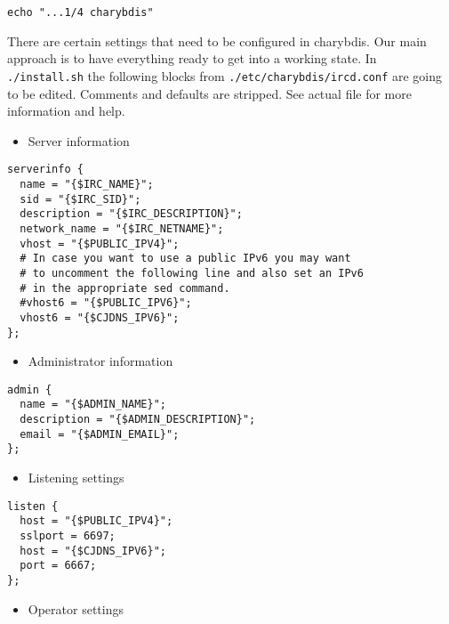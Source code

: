 \documentclass[12pt]{report}
\begin{document}
\begin{verbatim}
echo "...1/4 charybdis"
\end{verbatim}

There are certain settings that need to be configured in charybdis. Our
main approach is to have everything ready to get into a working state.
In \texttt{./install.sh} the following blocks from
\texttt{./etc/charybdis/ircd.conf} are going to be edited. Comments and
defaults are stripped. See actual file for more information and help.

\begin{itemize}

\item
  Server information
\end{itemize}

\begin{verbatim}
serverinfo {
  name = "{$IRC_NAME}";
  sid = "{$IRC_SID}";
  description = "{$IRC_DESCRIPTION}";
  network_name = "{$IRC_NETNAME}";
  vhost = "{$PUBLIC_IPV4}";
  # In case you want to use a public IPv6 you may want
  # to uncomment the following line and also set an IPv6
  # in the appropriate sed command.
  #vhost6 = "{$PUBLIC_IPV6}";
  vhost6 = "{$CJDNS_IPV6}";
};
\end{verbatim}

\begin{itemize}

\item
  Administrator information
\end{itemize}

\begin{verbatim}
admin {
  name = "{$ADMIN_NAME}";
  description = "{$ADMIN_DESCRIPTION}";
  email = "{$ADMIN_EMAIL}";
};
\end{verbatim}

\begin{itemize}

\item
  Listening settings
\end{itemize}

\begin{verbatim}
listen {
  host = "{$PUBLIC_IPV4}";
  sslport = 6697;
  host = "{$CJDNS_IPV6}";
  port = 6667;
};
\end{verbatim}

\begin{itemize}

\item
  Operator settings
\end{itemize}
\end{document}
